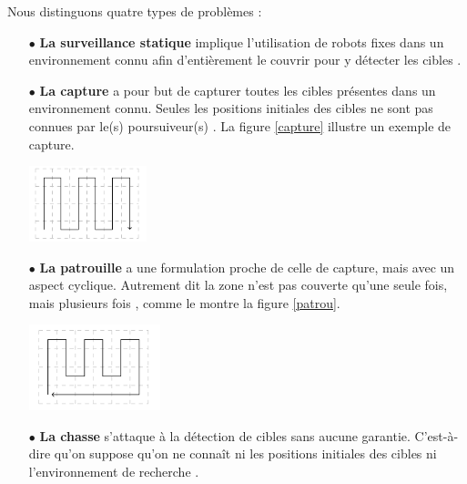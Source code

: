 Nous distinguons quatre types de problèmes : 
\begin{itemize}
	\item[$\bullet$] \textbf{La surveillance statique} implique l’utilisation de robots fixes dans un environnement connu afin d’entièrement le couvrir pour y détecter les cibles \cite{surv2}. 
	
	
	
	\item[$\bullet$] \textbf{La capture} a pour but de capturer toutes les cibles présentes dans un environnement connu. Seules les positions initiales des cibles ne sont pas connues par le(s) poursuiveur(s) \cite{surv2}. La figure \ref{capture} illustre un exemple de capture.
	\begin{center}	  
		\includegraphics[width=0.27\textwidth]{../Figures/capture.png}%
		\vspace{-0.1 cm}
		\label{capture}%
	\end{center}
	
	
	
	\item[$\bullet$] \textbf{La patrouille} a une formulation proche de celle de capture, mais avec un aspect cyclique. Autrement dit la zone n’est pas couverte qu’une seule fois, mais plusieurs fois \cite{surv2}, comme le montre la figure \ref{patrou}.
	\begin{center}	  
		\includegraphics[width=0.3\textwidth]{../Figures/patrolling.png}%
		\vspace{-0.1 cm}
		\label{patrou}%
	\end{center}
	
	\item[$\bullet$] \textbf{La chasse} s’attaque à la détection de cibles sans aucune garantie. C’est-à-dire qu’on suppose qu’on ne connaît ni les positions initiales des cibles ni l’environnement de recherche \cite{surv2}. \\
\end{itemize}



